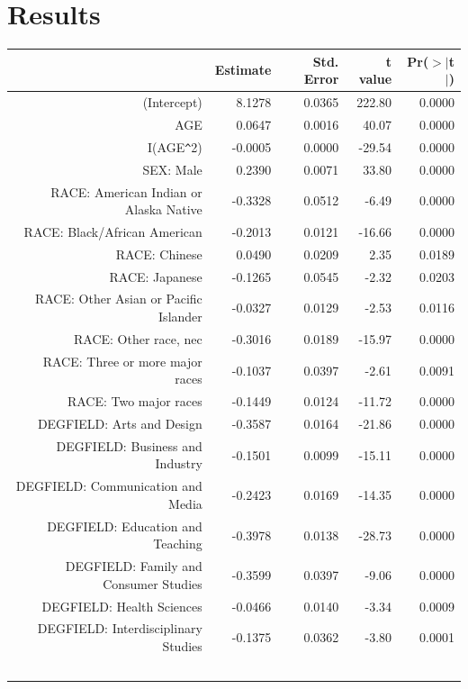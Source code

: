 \documentclass{article}
\begin{document}
\section*{Results}


\begin{table}[ht]
    \centering
    \begin{tabular}{rrrrr}
      \hline
     & Estimate & Std. Error & t value & Pr($>$$|$t$|$) \\ 
      \hline
    (Intercept) & 8.1278 & 0.0365 & 222.80 & 0.0000 \\ 
      AGE & 0.0647 & 0.0016 & 40.07 & 0.0000 \\ 
      I(AGE\verb|^|2) & -0.0005 & 0.0000 & -29.54 & 0.0000 \\ 
      SEX: Male & 0.2390 & 0.0071 & 33.80 & 0.0000 \\ 
      RACE: American Indian or Alaska Native & -0.3328 & 0.0512 & -6.49 & 0.0000 \\ 
      RACE: Black/African American & -0.2013 & 0.0121 & -16.66 & 0.0000 \\ 
      RACE: Chinese & 0.0490 & 0.0209 & 2.35 & 0.0189 \\ 
      RACE: Japanese & -0.1265 & 0.0545 & -2.32 & 0.0203 \\ 
      RACE: Other Asian or Pacific Islander & -0.0327 & 0.0129 & -2.53 & 0.0116 \\ 
      RACE: Other race, nec & -0.3016 & 0.0189 & -15.97 & 0.0000 \\ 
      RACE: Three or more major races & -0.1037 & 0.0397 & -2.61 & 0.0091 \\ 
      RACE: Two major races & -0.1449 & 0.0124 & -11.72 & 0.0000 \\ 
      DEGFIELD: Arts and Design & -0.3587 & 0.0164 & -21.86 & 0.0000 \\ 
      DEGFIELD: Business and Industry & -0.1501 & 0.0099 & -15.11 & 0.0000 \\ 
      DEGFIELD: Communication and Media & -0.2423 & 0.0169 & -14.35 & 0.0000 \\ 
      DEGFIELD: Education and Teaching & -0.3978 & 0.0138 & -28.73 & 0.0000 \\ 
      DEGFIELD: Family and Consumer Studies & -0.3599 & 0.0397 & -9.06 & 0.0000 \\ 
      DEGFIELD: Health Sciences & -0.0466 & 0.0140 & -3.34 & 0.0009 \\ 
      DEGFIELD: Interdisciplinary Studies & -0.1375 & 0.0362 & -3.80 & 0.0001 \\ 
$$
\end{tabular}
\end{table}
\end{document}
